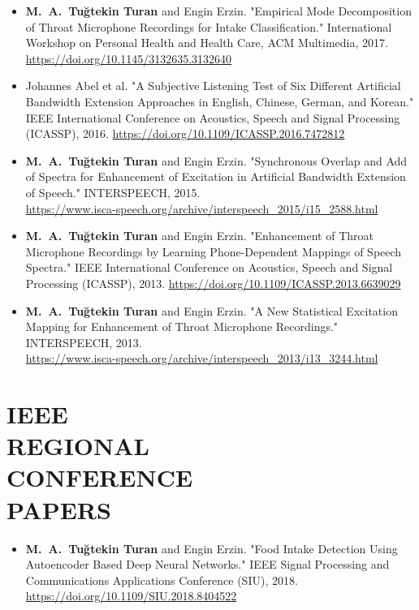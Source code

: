 \documentclass[margin, 10pt]{res} %
\begin{document}
\begin{resume}
\begin{itemize}[leftmargin=*]
    \item \textbf{M.~A.~Tu\u{g}tekin Turan} and Engin Erzin. "Empirical Mode Decomposition of Throat Microphone Recordings for Intake Classification." International Workshop on Personal Health and Health Care, ACM Multimedia, 2017. \\ \url{https://doi.org/10.1145/3132635.3132640}

    \item Johannes Abel et al. "A Subjective Listening Test of Six Different Artificial Bandwidth Extension Approaches in English, Chinese, German, and Korean." IEEE International Conference on Acoustics, Speech and Signal Processing (ICASSP), 2016. \hspace{.1em} \url{https://doi.org/10.1109/ICASSP.2016.7472812}

    \item \textbf{M.~A.~Tu\u{g}tekin Turan} and Engin Erzin. "Synchronous Overlap and Add of Spectra for Enhancement of Excitation in Artificial Bandwidth Extension of Speech." INTERSPEECH, 2015. \\ \url{https://www.isca-speech.org/archive/interspeech_2015/i15_2588.html}

    \item \textbf{M.~A.~Tu\u{g}tekin Turan} and Engin Erzin. "Enhancement of Throat Microphone Recordings by Learning Phone-Dependent Mappings of Speech Spectra." IEEE International Conference on Acoustics, Speech and Signal Processing (ICASSP), 2013. \hspace{.1em} \url{https://doi.org/10.1109/ICASSP.2013.6639029}

    \item \textbf{M.~A.~Tu\u{g}tekin Turan} and Engin Erzin. "A New Statistical Excitation Mapping for Enhancement of Throat Microphone Recordings." INTERSPEECH, 2013. \\ \url{https://www.isca-speech.org/archive/interspeech_2013/i13_3244.html} \\
\end{itemize}

\section{IEEE \\ REGIONAL \\ CONFERENCE \\ PAPERS}

\begin{itemize}[leftmargin=*]
    \item \textbf{M.~A.~Tu\u{g}tekin Turan} and Engin Erzin. "Food Intake Detection Using Autoencoder Based Deep Neural Networks." IEEE Signal Processing and Communications Applications Conference (SIU), 2018. \\ \url{https://doi.org/10.1109/SIU.2018.8404522}


\end{itemize}
\end{resume}
\end{document}
